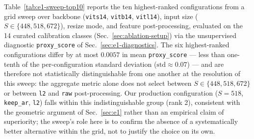 Table~\ref{tab:e1-sweep-top10} reports the ten highest-ranked configurations
from a grid sweep over backbone (\texttt{vits14}, \texttt{vitb14},
\texttt{vitl14}), input size ($S \in \{448, 518, 672\}$), resize mode, and
feature post-processing, evaluated on the 14 curated calibration classes
(Sec.~\ref{sec:ablation-setup}) via the unsupervised diagnostic
\texttt{proxy\_score} of Sec.~\ref{sec:e1-diagnostics}. The six
highest-ranked configurations differ by at most $0.0057$ in mean
\texttt{proxy\_score} --- less than one-tenth of the per-configuration
standard deviation ($\text{std} \approx 0.07$) --- and are therefore not
statistically distinguishable from one another at the resolution of this
sweep: the aggregate metric alone does not select between
$S \in \{448, 518, 672\}$ or between \texttt{l2} and \texttt{raw}
post-processing. Our production configuration ($S=518$,
\texttt{keep\_ar}, \texttt{l2}) falls within this indistinguishable
group (rank 2), consistent with the geometric argument of
Sec.~\ref{sec:e1} rather than an empirical claim of superiority; the
sweep's role here is to confirm the absence of a systematically better
alternative within the grid, not to justify the choice on its own.
 
